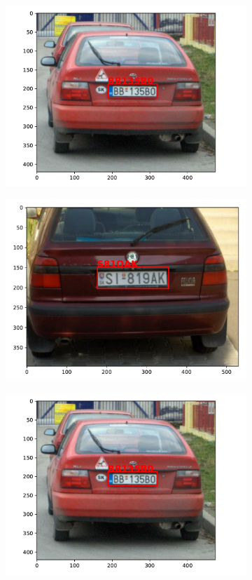 \begin{figure}
\begin{subfigure}{0.35\textwidth}
        \includegraphics[width=\textwidth]{abbildungen/prediction_01.pdf}
    \end{subfigure}
    \begin{subfigure}{0.35\textwidth}
        \includegraphics[width=\textwidth]{abbildungen/prediction_02.pdf}
    \end{subfigure}
    \begin{subfigure}{0.35\textwidth}
        \includegraphics[width=\textwidth]{abbildungen/prediction_01.pdf}

\end{subfigure}
\end{figure}

